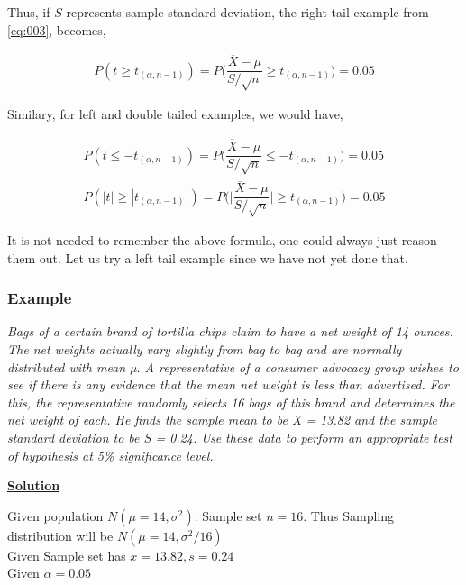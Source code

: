 \documentclass[float=false,crop=false]{standalone}
\begin{document}
Thus, if \(S\) represents sample standard deviation, the right tail
example from \ref{eq:003}, becomes,

    \begin{equation}
    \begin{aligned}
        P ( t \geq t_{(\alpha,n-1)} ) = P \Bigg(\dfrac{\overline{X} - \mu}{S/\sqrt{n}} \geq t_{(\alpha,n-1)} \Bigg) = 0.05 \label{eq:006}
    \end{aligned}
\end{equation}

    Similary, for left and double tailed examples, we would have,

\begin{equation}
    \begin{aligned}
        P ( t \leq -t_{(\alpha,n-1)} ) = P \Bigg(\dfrac{\overline{X} - \mu}{S/\sqrt{n}} \leq -t_{(\alpha,n-1)} \Bigg) = 0.05 \nonumber \\
        P ( |t| \geq |t_{(\alpha,n-1)}| ) = P \Bigg(\Big|\dfrac{\overline{X} - \mu}{S/\sqrt{n}}\Big| \geq t_{(\alpha,n-1)} \Bigg) = 0.05 \label{eq:007}
    \end{aligned}
\end{equation}

    It is not needed to remember the above formula, one could always just
reason them out. Let us try a left tail example since we have not yet
done that.

    \subsubsection{Example}\label{example}

\emph{Bags of a certain brand of tortilla chips claim to have a net
weight of 14 ounces. The net weights actually vary slightly from bag to
bag and are normally distributed with mean µ. A representative of a
consumer advocacy group wishes to see if there is any evidence that the
mean net weight is less than advertised. For this, the representative
randomly selects 16 bags of this brand and determines the net weight of
each. He finds the sample mean to be X = 13.82 and the sample standard
deviation to be S = 0.24. Use these data to perform an appropriate test
of hypothesis at 5\% significance level.}

    \textbf{\href{https://www.utdallas.edu/~mbaron/3341/Practice12.pdf}{Solution}}

Given population \(N(\mu = 14, \sigma^2)\). Sample set \(n = 16\). Thus
Sampling distribution will be \(N(\mu = 14, \sigma^2/16)\)\\
Given Sample set has \(\overline{x} = 13.82, s = 0.24\)\\
Given \(\alpha = 0.05\)
\end{document}
